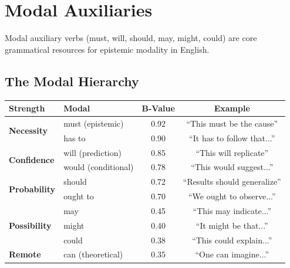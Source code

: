 \documentclass[11pt,a4paper]{article}
\theoremstyle{remark}
\begin{document}

\section{Modal Auxiliaries}
\label{sec:modals}

Modal auxiliary verbs (must, will, should, may, might, could) are core grammatical resources for epistemic modality in English.

\subsection{The Modal Hierarchy}

\begin{lexiconbox}[title={Modal Auxiliary B-Values}]
\begin{center}
\begin{tabular}{llcc}
\toprule
\textbf{Strength} & \textbf{Modal} & \textbf{B-Value} & \textbf{Example} \\
\midrule
\multirow{2}{*}{\textcolor{strongcolor}{\textbf{Necessity}}}
    & must (epistemic) & 0.92 & ``This must be the cause'' \\
    & has to & 0.90 & ``It has to follow that...'' \\
\midrule
\multirow{2}{*}{\textcolor{strongcolor}{\textbf{Confidence}}}
    & will (prediction) & 0.85 & ``This will replicate'' \\
    & would (conditional) & 0.78 & ``This would suggest...'' \\
\midrule
\multirow{2}{*}{\textcolor{moderatecolor}{\textbf{Probability}}}
    & should & 0.72 & ``Results should generalize'' \\
    & ought to & 0.70 & ``We ought to observe...'' \\
\midrule
\multirow{3}{*}{\textcolor{weakcolor}{\textbf{Possibility}}}
    & may & 0.45 & ``This may indicate...'' \\
    & might & 0.40 & ``It might be that...'' \\
    & could & 0.38 & ``This could explain...'' \\
\midrule
\textcolor{weakcolor}{\textbf{Remote}}
    & can (theoretical) & 0.35 & ``One can imagine...'' \\
\bottomrule
\end{tabular}
\end{center}
\end{lexiconbox}
\end{document}
